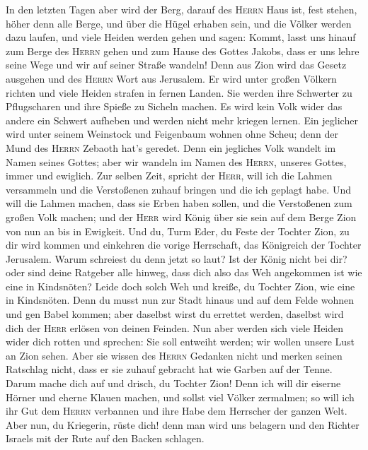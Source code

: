  In den letzten Tagen aber wird der Berg, darauf des
\textsc{Herrn} Haus ist, fest stehen, höher denn alle Berge, und über
die Hügel erhaben sein, und die Völker werden dazu laufen,
 und viele Heiden werden gehen und sagen: Kommt, lasst uns
hinauf zum Berge des \textsc{Herrn} gehen und zum Hause des Gottes
Jakobs, dass er uns lehre seine Wege und wir auf seiner Straße wandeln!
Denn aus Zion wird das Gesetz ausgehen und des \textsc{Herrn} Wort aus
Jerusalem.  Er wird unter großen Völkern richten und viele
Heiden strafen in fernen Landen. Sie werden ihre Schwerter zu
Pflugscharen und ihre Spieße zu Sicheln machen. Es wird kein Volk wider
das andere ein Schwert aufheben und werden nicht mehr kriegen lernen.
 Ein jeglicher wird unter seinem Weinstock und Feigenbaum
wohnen ohne Scheu; denn der Mund des \textsc{Herrn} Zebaoth hat's
geredet.  Denn ein jegliches Volk wandelt im Namen seines
Gottes; aber wir wandeln im Namen des \textsc{Herrn}, unseres Gottes,
immer und ewiglich.  Zur selben Zeit, spricht der
\textsc{Herr}, will ich die Lahmen versammeln und die Verstoßenen zuhauf
bringen und die ich geplagt habe.  Und will die Lahmen
machen, dass sie Erben haben sollen, und die Verstoßenen zum großen Volk
machen; und der \textsc{Herr} wird König über sie sein auf dem Berge
Zion von nun an bis in Ewigkeit.  Und du, Turm Eder, du
Feste der Tochter Zion, zu dir wird kommen und einkehren die vorige
Herrschaft, das Königreich der Tochter Jerusalem.  Warum
schreiest du denn jetzt so laut? Ist der König nicht bei dir? oder sind
deine Ratgeber alle hinweg, dass dich also das Weh angekommen ist wie
eine in Kindsnöten?  Leide doch solch Weh und kreiße, du
Tochter Zion, wie eine in Kindsnöten. Denn du musst nun zur Stadt hinaus
und auf dem Felde wohnen und gen Babel kommen; aber daselbst wirst du
errettet werden, daselbst wird dich der \textsc{Herr} erlösen von deinen
Feinden.  Nun aber werden sich viele Heiden wider dich
rotten und sprechen: Sie soll entweiht werden; wir wollen unsere Lust an
Zion sehen.  Aber sie wissen des \textsc{Herrn} Gedanken
nicht und merken seinen Ratschlag nicht, dass er sie zuhauf gebracht hat
wie Garben auf der Tenne.  Darum mache dich auf und
drisch, du Tochter Zion! Denn ich will dir eiserne Hörner und eherne
Klauen machen, und sollst viel Völker zermalmen; so will ich ihr Gut dem
\textsc{Herrn} verbannen und ihre Habe dem Herrscher der ganzen Welt.
 Aber nun, du Kriegerin, rüste dich! denn man wird uns
belagern und den Richter Israels mit der Rute auf den Backen schlagen.

